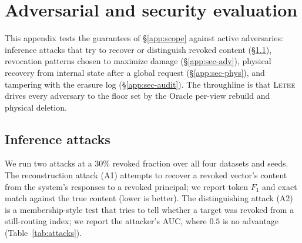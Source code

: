 \documentclass[sigconf, nonacm, review]{acmart}
\begin{document}
\section{Adversarial and security evaluation}
\label{app:security}

This appendix tests the guarantees of \S\ref{app:scope} against active
adversaries: inference attacks that try to recover or distinguish revoked
content (\S\ref{app:sec-attacks}), revocation patterns chosen to maximize
damage (\S\ref{app:sec-adv}), physical recovery from internal state after a
global request (\S\ref{app:sec-phys}), and tampering with the erasure log
(\S\ref{app:sec-audit}). The throughline is that \textsc{Lethe} drives every
adversary to the floor set by the Oracle per-view rebuild and physical
deletion.

\subsection{Inference attacks}
\label{app:sec-attacks}
We run two attacks at a $30\%$ revoked fraction over all four datasets and
seeds. The reconstruction attack (A1) attempts to recover a revoked vector's
content from the system's responses to a revoked principal; we report token
$F_1$ and exact match against the true content (lower is better). The
distinguishing attack (A2) is a membership-style test that tries to tell whether
a target was revoked from a still-routing index; we report the attacker's AUC,
where $0.5$ is no advantage (Table~\ref{tab:attacks}).
\end{document}
